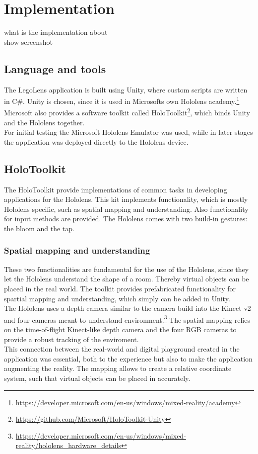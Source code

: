 \section{Implementation}
what is the implementation about\\
show screenshot\\


\subsection{Language and tools}
The LegoLens application is built using Unity, where custom scripts are written in C\#. Unity is chosen, since it is used in Microsofts own Hololens academy.\footnote{\url{https://developer.microsoft.com/en-us/windows/mixed-reality/academy}} Microsoft also provides a software toolkit called HoloToolkit\footnote{\url{https://github.com/Microsoft/HoloToolkit-Unity}}, which binds Unity and the Hololens together. \\
For initial testing the Microsoft Hololens Emulator was used, while in later stages the application was deployed directly to the Hololens device. 

\subsection{HoloToolkit}
The HoloToolkit provide implementations of common tasks in developing applications for the Hololens. This kit implements functionality, which is mostly Hololens specific, such as spatial mapping and understanding. Also functionality for input methods are provided. The Hololens comes with two build-in gestures: the bloom and the tap.

\subsubsection{Spatial mapping and understanding}
These two functionalities are fundamental for the use of the Hololens, since they let the Hololens understand the shape of a room. Thereby virtual objects can be placed in the real world. The toolkit provides prefabricated functionality for spartial mapping and understanding, which simply can be added in Unity.  \\
The Hololens uses a depth camera similar to the camera build into the Kinect v2 and four cameras meant to understand environment.\footnote{\url{https://developer.microsoft.com/en-us/windows/mixed-reality/hololens_hardware_details}} The spatial mapping relies on the time-of-flight Kinect-like depth camera and the four RGB cameras to provide a robust tracking of the enviroment. \\
This connection between the real-world and digital playground created in the application was essential, both to the experience but also to make the application augmenting the reality. The mapping allows to create a relative coordinate system, such that virtual objects can be placed in accurately.

